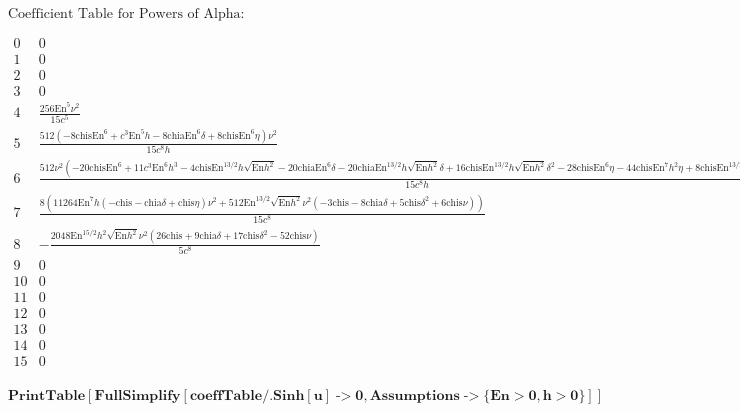 \documentclass{article}
\begin{document}
\noindent\(\text{Coefficient Table for Powers of Alpha:}\)

\noindent\(\begin{array}{l|l}
 0 & 0 \\
 1 & 0 \\
 2 & 0 \\
 3 & 0 \\
 4 & \frac{256 \text{En}^5 \nu ^2}{15 c^5} \\
 5 & \frac{512 \left(-8 \text{chis} \text{En}^6+c^3 \text{En}^5 h-8 \text{chia} \text{En}^6 \delta +8 \text{chis} \text{En}^6 \eta \right) \nu ^2}{15
c^8 h} \\
 6 & \frac{512 \nu ^2 \left(-20 \text{chis} \text{En}^6+11 c^3 \text{En}^6 h^3-4 \text{chis} \text{En}^{13/2} h \sqrt{\text{En} h^2}-20 \text{chia}
\text{En}^6 \delta -20 \text{chia} \text{En}^{13/2} h \sqrt{\text{En} h^2} \delta +16 \text{chis} \text{En}^{13/2} h \sqrt{\text{En} h^2} \delta
^2-28 \text{chis} \text{En}^6 \eta -44 \text{chis} \text{En}^7 h^2 \eta +8 \text{chis} \text{En}^{13/2} h \sqrt{\text{En} h^2} \nu \right)}{15 c^8
h} \\
 7 & \frac{8 \left(11264 \text{En}^7 h (-\text{chis}-\text{chia} \delta +\text{chis} \eta ) \nu ^2+512 \text{En}^{13/2} \sqrt{\text{En} h^2} \nu
^2 \left(-3 \text{chis}-8 \text{chia} \delta +5 \text{chis} \delta ^2+6 \text{chis} \nu \right)\right)}{15 c^8} \\
 8 & -\frac{2048 \text{En}^{15/2} h^2 \sqrt{\text{En} h^2} \nu ^2 \left(26 \text{chis}+9 \text{chia} \delta +17 \text{chis} \delta ^2-52 \text{chis}
\nu \right)}{5 c^8} \\
 9 & 0 \\
 10 & 0 \\
 11 & 0 \\
 12 & 0 \\
 13 & 0 \\
 14 & 0 \\
 15 & 0 \\
\end{array}\)

\begin{doublespace}
\noindent\(\pmb{\text{PrintTable}[\text{FullSimplify}[\text{coeffTable}\text{/.}\text{Sinh}[u]\text{-$>$}0,\text{Assumptions}\text{-$>$}\{\text{En}>0,h>0\}]]}\)
\end{doublespace}
\end{document}
